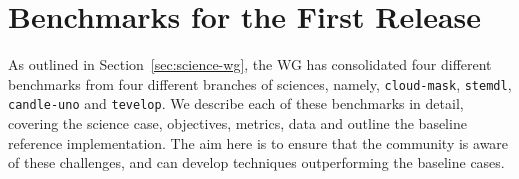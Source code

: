 \section{Benchmarks for the First Release}
\label{sec:benchmarks}

As outlined in Section~\ref{sec:science-wg}, the WG has consolidated four different benchmarks from four different branches of sciences, namely, {\tt cloud-mask}, {\tt stemdl}, {\tt candle-uno} and {\tt tevelop}. We describe each of these benchmarks in detail, covering the science case, objectives, metrics, data and outline the baseline reference implementation. The aim here is to ensure that the community is aware of these challenges, and can develop techniques outperforming the baseline cases. 





